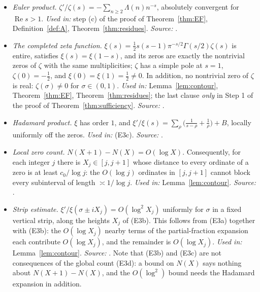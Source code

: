 \documentclass[11pt]{amsart}
\theoremstyle{definition}
\theoremstyle{remark}
\newcommand{\Rel}{\operatorname{Re}}
\begin{document}
\begin{itemize}
\item[\textbf{(E1)}] \emph{Euler product.}
$\zeta'/\zeta(s)=-\sum_{n\ge2}\Lambda(n)n^{-s}$, absolutely convergent for
$\Rel s>1$.  \emph{Used in:} step (c) of the proof of Theorem~\ref{thm:EF},
Definition~\ref{def:A}, Theorem~\ref{thm:residues}.
\emph{Source:} \cite[\S1.1]{IK}.

\item[\textbf{(E2)}] \emph{The completed zeta function.}
$\xi(s)=\tfrac12s(s-1)\pi^{-s/2}\Gamma(s/2)\zeta(s)$ is entire, satisfies
$\xi(s)=\xi(1-s)$, and its zeros are exactly the nontrivial zeros of $\zeta$
with the same multiplicities; $\zeta$ has a simple pole at $s=1$,
$\zeta(0)=-\tfrac12$, and $\xi(0)=\xi(1)=\tfrac12\ne0$.  In addition, no
nontrivial zero of $\zeta$ is real: $\zeta(\sigma)\ne0$ for
$\sigma\in(0,1)$.  \emph{Used in:} Lemma~\ref{lem:contour},
Theorem~\ref{thm:EF}, Theorem~\ref{thm:residues}; the last clause \emph{only}
in Step 1 of the proof of Theorem~\ref{thm:sufficiency}.
\emph{Source:} \cite[\S5.1]{IK}.

\item[\textbf{(E3a)}] \emph{Hadamard product.}  $\xi$ has order $1$, and
$\xi'/\xi(s)=\sum_\rho\bigl(\frac1{s-\rho}+\frac1\rho\bigr)+B$, locally
uniformly off the zeros.  \emph{Used in:} (E3c).
\emph{Source:} \cite[ch.~12]{Davenport}.

\item[\textbf{(E3b)}] \emph{Local zero count.}
$N(X+1)-N(X)=O(\log X)$.  Consequently, for each integer $j$ there is
$X_j\in[j,j+1]$ whose distance to every ordinate of a zero is at least
$c_0/\log j$: the $O(\log j)$ ordinates in $[j,j+1]$ cannot block every
subinterval of length $\asymp1/\log j$.  \emph{Used in:}
Lemma~\ref{lem:contour}.  \emph{Source:} \cite[ch.~15]{Davenport}.

\item[\textbf{(E3c)}] \emph{Strip estimate.}
$\xi'/\xi(\sigma\pm iX_j)=O(\log^2X_j)$ uniformly for $\sigma$ in a fixed
vertical strip, along the heights $X_j$ of (E3b).  This follows from (E3a)
together with (E3b): the $O(\log X_j)$ nearby terms of the partial-fraction
expansion each contribute $O(\log X_j)$, and the remainder is $O(\log X_j)$.
\emph{Used in:} Lemma~\ref{lem:contour}.
\emph{Source:} \cite[ch.~17]{Davenport}.
Note that (E3b) and (E3c) are not consequences of the global count
(E3d): a bound on $N(X)$ says nothing about $N(X+1)-N(X)$, and the $O(\log^2)$
bound needs the Hadamard expansion in addition.


\end{itemize}
\end{document}
